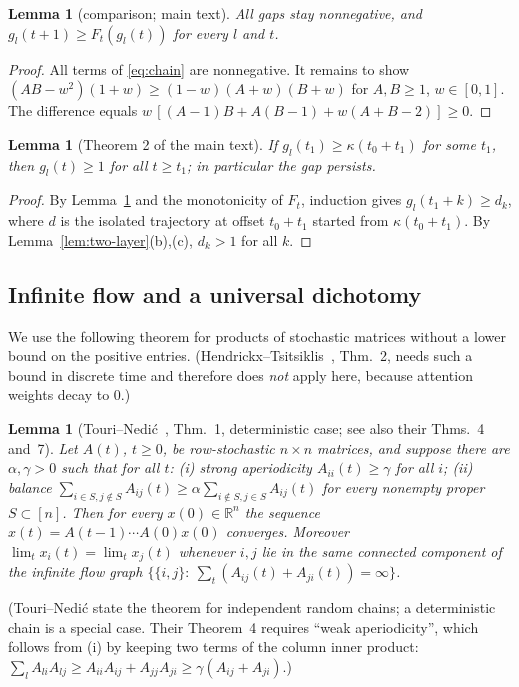 \documentclass[11pt]{article}
\newtheorem{lemma}[theorem]{Lemma}
\theoremstyle{definition}
\theoremstyle{remark}
\newcommand{\R}{\mathbb{R}}
\begin{document}
\begin{lemma}[comparison; main text]\label{lem:comparison}
All gaps stay nonnegative, and $g_l(t+1)\ge F_t(g_l(t))$ for every $l$ and $t$.
\end{lemma}
\begin{proof}
All terms of \eqref{eq:chain} are nonnegative. It remains to show
$(AB-w^2)(1+w)\ge(1-w)(A+w)(B+w)$ for $A,B\ge1$, $w\in[0,1]$. The difference equals
$w\,[(A-1)B+A(B-1)+w(A+B-2)]\ge0$.
\end{proof}

\begin{lemma}[Theorem 2 of the main text]\label{lem:thm2}
If $g_l(t_1)\ge\kappa(t_0+t_1)$ for some $t_1$, then $g_l(t)\ge1$ for all $t\ge t_1$; in particular the gap persists.
\end{lemma}
\begin{proof}
By Lemma~\ref{lem:comparison} and the monotonicity of $F_t$, induction gives
$g_l(t_1+k)\ge d_k$, where $d$ is the isolated trajectory at offset $t_0+t_1$ started from
$\kappa(t_0+t_1)$. By Lemma~\ref{lem:two-layer}(b),(c), $d_k>1$ for all $k$.
\end{proof}

\subsection{Infinite flow and a universal dichotomy}
We use the following theorem for products of stochastic matrices without a lower bound on the
positive entries. (Hendrickx--Tsitsiklis~\cite{HT13}, Thm.~2, needs such a bound in discrete time
and therefore does \emph{not} apply here, because attention weights decay to $0$.)

\begin{lemma}[Touri--Nedi\'c~\cite{TN14}, Thm.~1, deterministic case; see also their Thms.~4 and~7]\label{lem:TN}
Let $A(t)$, $t\ge0$, be row-stochastic $n\times n$ matrices, and suppose there are $\alpha,\gamma>0$ such that for all $t$:
(i) \emph{strong aperiodicity} $A_{ii}(t)\ge\gamma$ for all $i$; (ii) \emph{balance}
$\sum_{i\in S,j\notin S}A_{ij}(t)\ge\alpha\sum_{i\notin S,j\in S}A_{ij}(t)$ for every nonempty proper $S\subset[n]$.
Then for every $x(0)\in\R^n$ the sequence $x(t)=A(t-1)\cdots A(0)x(0)$ converges. Moreover
$\lim_tx_i(t)=\lim_tx_j(t)$ whenever $i,j$ lie in the same connected component of the
\emph{infinite flow graph} $\{\{i,j\}:\ \sum_t(A_{ij}(t)+A_{ji}(t))=\infty\}$.
\end{lemma}
(Touri--Nedi\'c state the theorem for independent random chains; a deterministic chain is a special case.
Their Theorem~4 requires ``weak aperiodicity'', which follows from (i) by keeping two terms of the column
inner product: $\sum_lA_{li}A_{lj}\ge A_{ii}A_{ij}+A_{jj}A_{ji}\ge\gamma(A_{ij}+A_{ji})$.)
\end{document}
